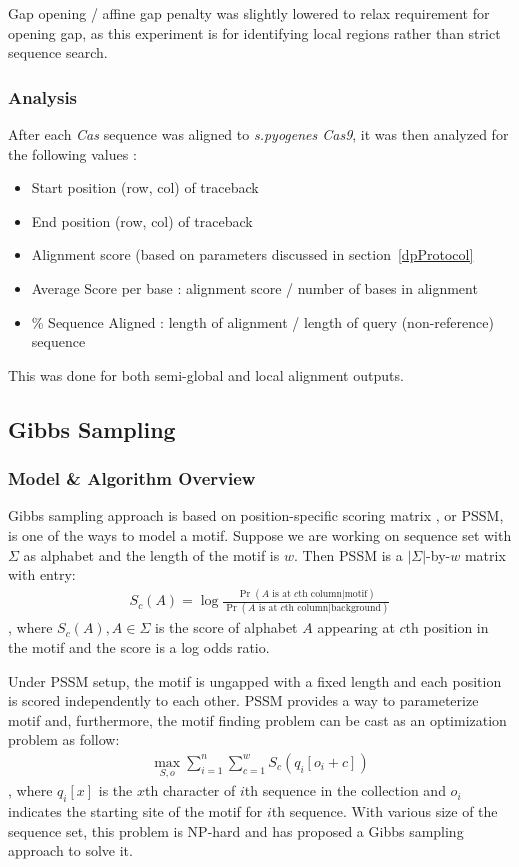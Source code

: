 \documentclass[11pt, oneside]{article}
\begin{document}
Gap opening / affine gap penalty was slightly lowered to relax requirement for opening gap, as this experiment is for identifying local regions rather than strict sequence search.


\subsubsection{Analysis}

After each \textit{Cas} sequence was aligned to \textit{s.pyogenes Cas9}, it was then analyzed for the following values :
\begin{itemize}
\item Start position (row, col) of traceback
\item End position (row, col) of traceback
\item Alignment score (based on parameters discussed in section~\ref{dpProtocol}
\item Average Score per base : alignment score / number of bases in alignment
\item \% Sequence Aligned : length of alignment / length of query (non-reference) sequence
\end{itemize}

This was done for both semi-global and local alignment outputs. 

\subsection{Gibbs Sampling}

\subsubsection{Model \& Algorithm Overview}

Gibbs sampling approach is based on position-specific scoring matrix \cite{stormo1982use}, or PSSM, is one of the ways to model a motif. Suppose we are working on sequence set with $\Sigma$ as alphabet and the length of the motif is $w$. Then PSSM is a $|\Sigma|$-by-$w$ matrix with entry:
\begin{align*}
  S_c(A) = \log \frac{\Pr(\text{$A$ is at $c$th column}|\text{motif})}{\Pr(\text{$A$ is at $c$th column}|\text{background})}
\end{align*}
, where $S_c(A), A \in \Sigma$ is the score of alphabet $A$ appearing at $c$th position in the motif and the score is a log odds ratio.

Under PSSM setup, the motif is ungapped with a fixed length and each position is scored independently to each other. PSSM provides a way to parameterize motif and, furthermore, the motif finding problem can be cast as an optimization problem as follow:
\begin{align}
  \max_{S, o} \sum_{i = 1}^n \sum_{c = 1}^w S_c(q_i[o_i + c]) \label{eq:obj}
\end{align}
, where $q_i[x]$ is the $x$th character of $i$th sequence in the collection and $o_i$ indicates the starting site of the motif for $i$th sequence. With various size of the sequence set, this problem is NP-hard and \cite{lawrence1993detecting} has proposed a Gibbs sampling approach to solve it. 
\end{document}
